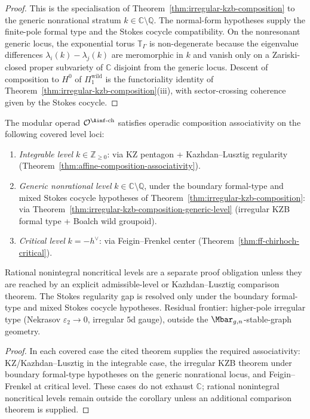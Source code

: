 \begin{proof}
This is the specialisation of
Theorem~\ref{thm:irregular-kzb-composition} to the generic nonrational
stratum $k \in \mathbb{C} \setminus \mathbb{Q}$. The normal-form
hypotheses supply the finite-pole formal type and the Stokes cocycle
compatibility. On the nonresonant generic locus, the
exponential torus $\mathbb{T}_\Gamma$ is non-degenerate
because the eigenvalue differences $\lambda_i(k) - \lambda_j(k)$
are meromorphic in $k$ and vanish only on a Zariski-closed
proper subvariety of $\mathbb{C}$ disjoint from the generic
locus. Descent of composition to $H^0$ of
$\Pi_1^{\mathrm{wild}}$ is the functoriality identity of
Theorem~\ref{thm:irregular-kzb-composition}(iii), with
sector-crossing coherence given by the Stokes cocycle.
\end{proof}

\begin{corollary}
\label{cor:modop-composition-all-levels}

The modular operad $\mathcal{O}^{\Ainf\text{-ch}}$ satisfies
operadic composition associativity on the following covered level
loci:
\begin{enumerate}[label=\textup{(\alph*)}]
\item \emph{Integrable level} $k \in \mathbb{Z}_{\ge 0}$: via KZ
 pentagon + Kazhdan--Lusztig regularity
 (Theorem~\ref{thm:affine-composition-associativity}).
\item \emph{Generic nonrational level} $k \in \mathbb{C}
 \setminus \mathbb{Q}$, under the boundary formal-type and mixed
 Stokes cocycle hypotheses of
 Theorem~\ref{thm:irregular-kzb-composition}: via
 Theorem~\ref{thm:irregular-kzb-composition-generic-level}
 (irregular KZB formal type + Boalch wild groupoid).
\item \emph{Critical level} $k = -h^\vee$: via
 Feigin--Frenkel center
 (Theorem~\ref{thm:ff-chirhoch-critical}).
\end{enumerate}
Rational nonintegral noncritical levels are a separate proof
obligation unless they are reached by an explicit admissible-level or
Kazhdan--Lusztig comparison theorem. The Stokes regularity gap is
resolved only under the boundary formal-type and mixed Stokes
cocycle hypotheses. Residual frontier: higher-pole irregular type
(Nekrasov
$\varepsilon_2 \to 0$, irregular $5$d gauge), outside the
$\Mbar_{g,n}$-stable-graph geometry.
\end{corollary}

\begin{proof}
In each covered case the cited theorem supplies the required
associativity: KZ/Kazhdan--Lusztig in the integrable case, the
irregular KZB theorem under boundary formal-type hypotheses on the
generic nonrational locus, and
Feigin--Frenkel at critical level. These cases do not exhaust
$\mathbb C$; rational nonintegral noncritical levels remain outside the
corollary unless an additional comparison theorem is supplied.
\end{proof}

